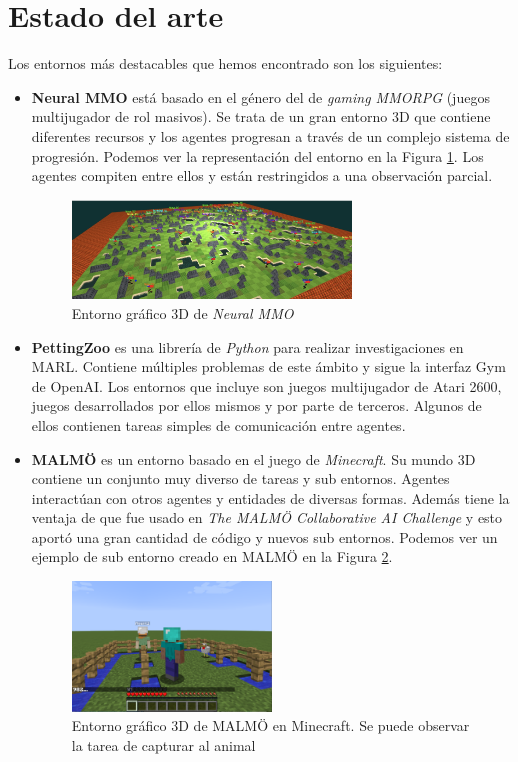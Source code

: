 \section{Estado del arte}

Los entornos más destacables que hemos encontrado son los siguientes:
\begin{itemize}
    \item \textbf{Neural MMO} está basado en el género del de \emph{gaming MMORPG} (juegos multijugador de rol masivos). Se trata de un gran entorno 3D que contiene diferentes recursos  y los agentes progresan a través de un complejo sistema de progresión. Podemos ver la representación del entorno en la Figura \ref {fig:neural-mmo}. Los agentes compiten entre ellos y están restringidos a una observación parcial. \cite {env-list} 
        \begin{figure}[ht]
            \centering
            \includegraphics[width=0.7\textwidth]{img/neural-mmo.png}
            \caption{Entorno gráfico 3D de \textit{Neural MMO} \cite{neural-mmo}}
            \label{fig:neural-mmo}
        \end{figure}
    \item \textbf{PettingZoo} es una librería de \textit{Python} para realizar investigaciones en MARL. Contiene múltiples problemas de este ámbito y sigue la interfaz Gym de OpenAI. Los entornos que incluye son juegos multijugador de Atari 2600, juegos desarrollados por ellos mismos y por parte de terceros. Algunos de ellos contienen tareas simples de comunicación entre agentes.\cite {env-list}
    \item \textbf{MALMÖ} es un entorno basado en el juego de \textit{Minecraft}. Su mundo 3D contiene un conjunto muy diverso de tareas y sub entornos. Agentes interactúan con otros agentes y entidades de diversas formas. Además tiene la ventaja de que fue usado en \emph{The MALMÖ Collaborative AI Challenge} y esto aportó una gran cantidad de código y nuevos sub entornos. \cite {env-list} Podemos ver un ejemplo de sub entorno creado en MALMÖ en la Figura \ref {fig:mob-chase}.
        \begin{figure}[ht]
            \centering
            \includegraphics[width=0.5\textwidth]{img/mobchase.png}
            \caption{Entorno gráfico 3D de MALMÖ en Minecraft. Se puede observar la tarea de capturar al animal \cite {malmo}}
            \label{fig:mob-chase}
        \end{figure}
        

\end{itemize}
